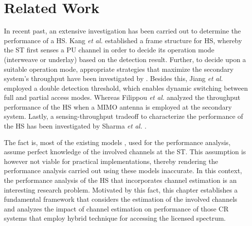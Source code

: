 \section{Related Work}


In recent past, an extensive investigation \cite{Kang09, Oh10, Senthu12, Song13, Gmira15, Jiang13, Fili15, Sharma14} has been carried out to determine the performance of a HS. Kang \textit{et al.} \cite{Kang09} established a frame structure for HS, whereby the ST first senses a PU channel in order to decide its operation mode (interweave or underlay) based on the detection result. Further, to decide upon a suitable operation mode, appropriate strategies that maximize the secondary system's throughput have been investigated by \cite{Oh10, Senthu12, Song13, Gmira15}. Besides this, Jiang \textit{et al.} \cite{Jiang13} employed a double detection threshold, which enables dynamic switching between full and partial access modes. Whereas Filippou \textit{et al.} \cite{Fili15} analyzed the throughput performance of the HS when a MIMO antenna is employed at the secondary system. Lastly, a sensing-throughput tradeoff to characterize the performance of the HS has been investigated by Sharma \textit{et al.} \cite{Sharma14}. 

The fact is, most of the existing models \cite{Kang09, Oh10, Senthu12, Song13, Gmira15, Jiang13, Fili15, Sharma14}, used for the performance analysis, assume perfect knowledge of the involved channels at the ST. This assumption is however not viable for practical implementations, thereby rendering the performance analysis carried out using these models inaccurate. In this context, the performance analysis of the HS that incorporates channel estimation is an interesting research problem. Motivated by this fact, this chapter establishes a fundamental framework that considers the estimation of the involved channels and analyzes the impact of channel estimation on performance of those CR systems that employ hybrid technique for accessing the licensed spectrum.
